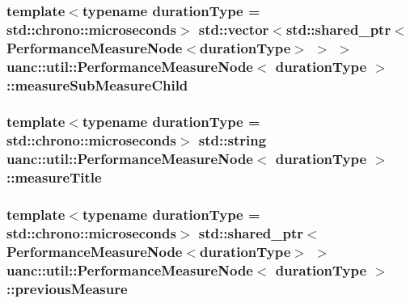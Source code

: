 \subsubsection[{\texorpdfstring{measure\+Sub\+Measure\+Child}{measureSubMeasureChild}}]{\setlength{\rightskip}{0pt plus 5cm}template$<$typename duration\+Type  = std\+::chrono\+::microseconds$>$ std\+::vector$<$std\+::shared\+\_\+ptr$<${\bf Performance\+Measure\+Node}$<$duration\+Type$>$ $>$ $>$ {\bf uanc\+::util\+::\+Performance\+Measure\+Node}$<$ duration\+Type $>$\+::measure\+Sub\+Measure\+Child}\hypertarget{classuanc_1_1util_1_1_performance_measure_node_a226829aeae0cbf90d0ec0fe05b486431}{}\label{classuanc_1_1util_1_1_performance_measure_node_a226829aeae0cbf90d0ec0fe05b486431}
\subsubsection[{\texorpdfstring{measure\+Title}{measureTitle}}]{\setlength{\rightskip}{0pt plus 5cm}template$<$typename duration\+Type  = std\+::chrono\+::microseconds$>$ std\+::string {\bf uanc\+::util\+::\+Performance\+Measure\+Node}$<$ duration\+Type $>$\+::measure\+Title}\hypertarget{classuanc_1_1util_1_1_performance_measure_node_aade3a613184f260d27b6ee46eebcaee6}{}\label{classuanc_1_1util_1_1_performance_measure_node_aade3a613184f260d27b6ee46eebcaee6}
\subsubsection[{\texorpdfstring{previous\+Measure}{previousMeasure}}]{\setlength{\rightskip}{0pt plus 5cm}template$<$typename duration\+Type  = std\+::chrono\+::microseconds$>$ std\+::shared\+\_\+ptr$<${\bf Performance\+Measure\+Node}$<$duration\+Type$>$ $>$ {\bf uanc\+::util\+::\+Performance\+Measure\+Node}$<$ duration\+Type $>$\+::previous\+Measure}\hypertarget{classuanc_1_1util_1_1_performance_measure_node_a32e4f3a9afcee94d9ea000ea66c3dbd2}{}\label{classuanc_1_1util_1_1_performance_measure_node_a32e4f3a9afcee94d9ea000ea66c3dbd2}
